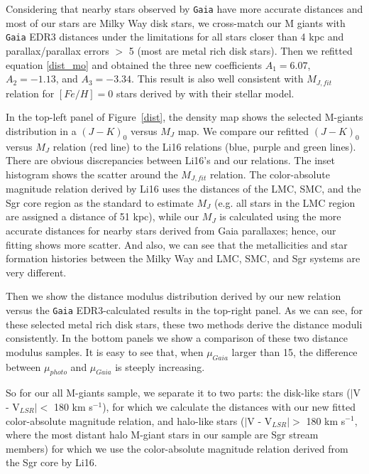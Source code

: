 \documentclass[manuscript]{aastex62}
\newcommand{\gaia}{\texttt{Gaia}}
\begin{document}
\begin{CJK*}{UTF8}{gbsn}
Considering that nearby stars observed by \gaia{} have more accurate distances and most of our stars are Milky Way disk stars, we cross-match our M giants with \gaia{} EDR3 distances \citep{2021AJ....161...147B} under the limitations for all stars closer than 4 kpc and parallax/parallax errors $>$ 5
(most are metal rich disk stars). Then we refitted equation \ref{dist_mo} and obtained the three new coefficients $A_{1}=6.07$, $A_{2}=-1.13$, and $A_{3}=-3.34$. This result is also well consistent with $M_{J,fit}$ relation for $[Fe/H]=0$ stars derived by \citet{2014ApJ...793...62S} with their stellar model.

In the top-left panel of Figure~\ref{dist}, the density map shows the selected M-giants distribution in a $(J-K)_{0}$ versus $M_J$ map. We compare our refitted $(J-K)_{0}$ versus $M_J$ relation (red line) to the Li16 relations (blue, purple and green lines). There are obvious discrepancies between Li16's and our relations. The inset histogram shows the scatter around the $M_{J,fit}$ relation. The color-absolute magnitude relation derived by Li16 uses the distances of the LMC, SMC, and the Sgr core region as the standard to estimate $M_J$ (e.g. all stars in the LMC region are assigned a distance of 51 kpc), while our $M_J$ is calculated using the more accurate distances for nearby stars derived from Gaia parallaxes; hence, our fitting shows more scatter. And also, we can see that the metallicities and star formation histories between the Milky Way and LMC, SMC, and Sgr systems are very different. 

Then we show the distance modulus distribution derived by our new relation versus the \gaia{} EDR3-calculated results in the top-right panel. As we can see, for these selected metal rich disk stars, these two methods derive the distance moduli consistently. In the bottom panels we show a comparison of these two distance modulus samples. It is easy to see that, when $\mu_{Gaia}$ larger than 15, the difference between $\mu_{photo}$ and $\mu_{Gaia}$ is steeply increasing.

So for our all M-giants sample, we separate it to two parts: the disk-like stars ($\mid$V - V$_{LSR} \mid <$ 180 km s$^{-1}$), for which we calculate the distances with our new fitted color-absolute magnitude relation, and halo-like stars ($\mid$V - V$_{LSR} \mid  >$ 180 km s$^{-1}$, where the most distant halo M-giant stars in our sample are Sgr stream members) for which we use the color-absolute magnitude relation derived from the Sgr core by Li16.


\end{CJK*}
\end{document}
